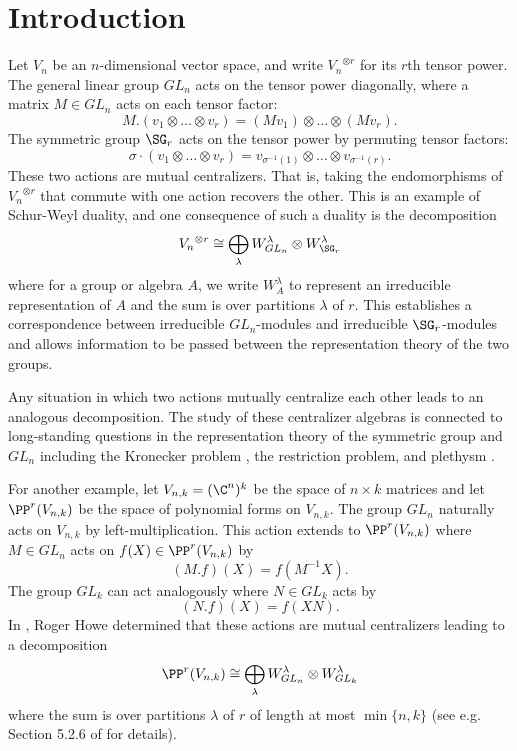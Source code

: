 

\section{Introduction}

Let $V_n$ be an $n$-dimensional vector space, and write ${V_n}^{\otimes r}$ for its $r$th tensor power. The general linear group $GL_n$ acts on the tensor power diagonally, where a matrix $M\in GL_n$ acts on each tensor factor: \[M.(v_1\otimes\dots\otimes v_r)=(Mv_1)\otimes\dots\otimes (Mv_r).\] The symmetric group $\SG_r$ acts on the tensor power by permuting tensor factors: \[\sigma\cdot(v_1\otimes\dots\otimes v_r)=v_{\sigma^{-1}(1)}\otimes\dots\otimes v_{\sigma^{-1}(r)}.\] These two actions are mutual centralizers. That is, taking the endomorphisms of ${V_n}^{\otimes r}$ that commute with one action recovers the other. This is an example of Schur-Weyl duality, and one consequence of such a duality is the decomposition \[{V_n}^{\otimes r}\cong\bigoplus_{\lambda}W_{GL_n}^\lambda\otimes W_{\SG_r}^\lambda\] where for a group or algebra $A$, we write $W_A^\lambda$ to represent an irreducible representation of $A$ and the sum is over partitions $\lambda$ of $r$. This establishes a correspondence between irreducible $GL_n$-modules and irreducible $\SG_r$-modules and allows information to be passed between the representation theory of the two groups.

Any situation in which two actions mutually centralize each other leads to an analogous decomposition. The study of these centralizer algebras is connected to long-standing questions in the representation theory of the symmetric group and $GL_n$ including the Kronecker problem \cite{bowman2015partition,orellana2020howe}, the restriction problem, and plethysm \cite{orellana2021uniform}.

For another example, let $V_{n,k}=(\C^n)^k$ be the space of $n\times k$ matrices and let $\PP^r(V_{n,k})$ be the space of polynomial forms on $V_{n,k}$. The group $GL_n$ naturally acts on $V_{n,k}$ by left-multiplication. This action extends to $\PP^r(V_{n,k})$ where $M\in GL_n$ acts on $f(X)\in\PP^r(V_{n,k})$ by \[(M.f)(X)=f(M^{-1}X).\] The group $GL_k$ can act analogously where $N\in GL_k$ acts by \[(N.f)(X)=f(XN).\] In \cite{howe}, Roger Howe determined that these actions are mutual centralizers leading to a decomposition \[\PP^r(V_{n,k})\cong\bigoplus_{\lambda} W_{GL_n}^\lambda\otimes W_{GL_k}^\lambda\] where the sum is over partitions $\lambda$ of $r$ of length at most $\min\{n,k\}$ (see e.g. Section 5.2.6 of \cite{gw} for details).

